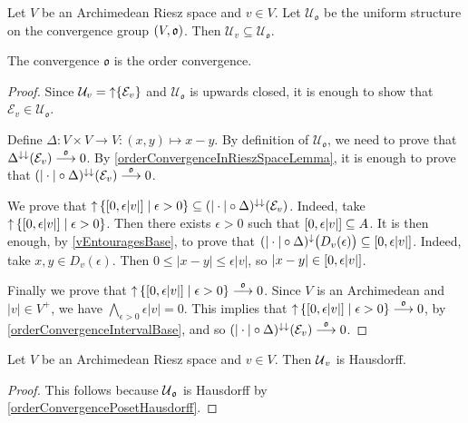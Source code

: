 \begin{proposition} \label{OrderConvergenceWeakerThenUniformConvergenceArchimedeanRieszSpace}
Let $V$ be an Archimedean Riesz space and $v\in V$. Let $\mathcal{U}_\mathfrak{o}$ be the uniform structure on the convergence group $\sSet{V,\mathfrak{o}}$. Then $\mathcal{U}_v \subseteq \mathcal{U}_\mathfrak{o}$.
\end{proposition}
The convergence $\mathfrak{o}$ is the order convergence.
\begin{proof}
Since $\mathcal{U}_v = \operatorname{\uparrow}\{\mathcal{E}_v\}$ and $\mathcal{U}_\mathfrak{o}$ is upwards closed, it is enough to show that $\mathcal{E}_v \in \mathcal{U}_\mathfrak{o}$.

Define $\Delta: V\times V \to V: (x,y) \mapsto x-y$. By definition of $\mathcal{U}_\mathfrak{o}$, we need to prove that $\Delta^{\downarrow\downarrow}(\mathcal{E}_v) \overset{\mathfrak{o}}{\longrightarrow} 0$. By \ref{orderConvergenceInRieszSpaceLemma}, it is enough to prove that $(|\cdot| \circ \Delta)^{\downarrow\downarrow}(\mathcal{E}_v) \overset{\mathfrak{o}}{\longrightarrow} 0$.

We prove that $\upset\setbuilder{\interval{0,\epsilon |v|}}{\epsilon > 0} \subseteq (|\cdot| \circ \Delta)^{\imf\imf}(\mathcal{E}_v)$. Indeed, take $\upset\setbuilder{\interval{0,\epsilon |v|}}{\epsilon > 0}$. Then there exists $\epsilon >0$ such that $\interval{0,\epsilon |v|} \subseteq A$. It is then enough, by \ref{vEntouragesBase}, to prove that $(|\cdot|\circ \Delta)^\imf\big(D_v(\epsilon)\big) \subseteq \interval{0,\epsilon |v|}$. Indeed, take $x,y\in D_v(\epsilon)$. Then $0 \leq |x-y| \leq \epsilon |v|$, so $|x-y| \in \interval{0,\epsilon |v|}$.

Finally we prove that $\upset\setbuilder{\interval{0,\epsilon |v|}}{\epsilon > 0} \overset{\mathfrak{o}}{\longrightarrow} 0$. Since $V$ is an Archimedean and $|v|\in V^+$, we have $\bigwedge_{\epsilon > 0}\epsilon |v| = 0$. This implies that $\upset\setbuilder{\interval{0,\epsilon |v|}}{\epsilon > 0} \overset{\mathfrak{o}}{\longrightarrow} 0$, by \ref{orderConvergenceIntervalBase}, and so $(|\cdot| \circ \Delta)^{\downarrow\downarrow}(\mathcal{E}_v) \overset{\mathfrak{o}}{\longrightarrow} 0$.
\end{proof}
\begin{corollary}
Let $V$ be an Archimedean Riesz space and $v\in V$. Then $\operatorname{\mathcal{U}}_v$ is Hausdorff.
\end{corollary}
\begin{proof}
This follows because $\operatorname{\mathcal{U}}_\mathfrak{o}$ is Hausdorff by \ref{orderConvergencePosetHausdorff}.
\end{proof}

